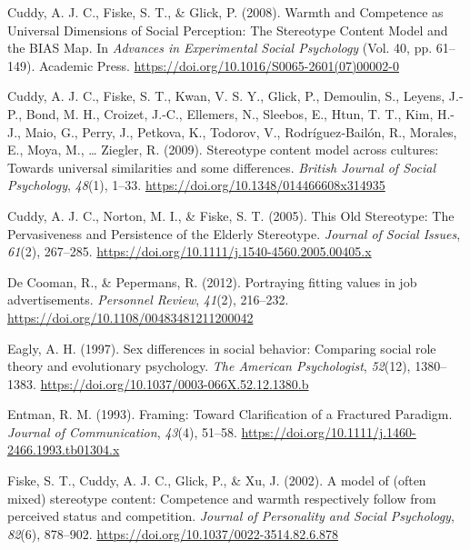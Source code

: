 \documentclass[
  12pt,
  letterpaper,
  DIV=11,
  numbers=noendperiod]{scrartcl}
\newlength{\cslhangindent}
\newlength{\cslentryspacingunit} %
\newenvironment{CSLReferences}[2] %
 {%
  \setlength{\parindent}{0pt}
  \ifodd #1
  \let\oldpar\par
  \def\par{\hangindent=\cslhangindent\oldpar}
  \fi
  \setlength{\parskip}{#2\cslentryspacingunit}
 }%
 {}
\begin{document}
\begin{CSLReferences}{1}{0}
\leavevmode{}%
Cuddy, A. J. C., Fiske, S. T., \& Glick, P. (2008). Warmth and
{Competence} as {Universal Dimensions} of {Social Perception}: {The
Stereotype Content Model} and the {BIAS Map}. In \emph{Advances in
{Experimental Social Psychology}} (Vol. 40, pp. 61--149). {Academic
Press}. \url{https://doi.org/10.1016/S0065-2601(07)00002-0}

\leavevmode{}%
Cuddy, A. J. C., Fiske, S. T., Kwan, V. S. Y., Glick, P., Demoulin, S.,
Leyens, J.-P., Bond, M. H., Croizet, J.-C., Ellemers, N., Sleebos, E.,
Htun, T. T., Kim, H.-J., Maio, G., Perry, J., Petkova, K., Todorov, V.,
Rodríguez‐Bailón, R., Morales, E., Moya, M., \ldots{} Ziegler, R.
(2009). Stereotype content model across cultures: {Towards} universal
similarities and some differences. \emph{British Journal of Social
Psychology}, \emph{48}(1), 1--33.
\url{https://doi.org/10.1348/014466608x314935}

\leavevmode{}%
Cuddy, A. J. C., Norton, M. I., \& Fiske, S. T. (2005). This {Old
Stereotype}: {The Pervasiveness} and {Persistence} of the {Elderly
Stereotype}. \emph{Journal of Social Issues}, \emph{61}(2), 267--285.
\url{https://doi.org/10.1111/j.1540-4560.2005.00405.x}

\leavevmode{}%
De Cooman, R., \& Pepermans, R. (2012). Portraying fitting values in job
advertisements. \emph{Personnel Review}, \emph{41}(2), 216--232.
\url{https://doi.org/10.1108/00483481211200042}

\leavevmode{}%
Eagly, A. H. (1997). Sex differences in social behavior: Comparing
social role theory and evolutionary psychology. \emph{The American
Psychologist}, \emph{52}(12), 1380--1383.
\url{https://doi.org/10.1037/0003-066X.52.12.1380.b}

\leavevmode{}%
Entman, R. M. (1993). Framing: {Toward Clarification} of a {Fractured
Paradigm}. \emph{Journal of Communication}, \emph{43}(4), 51--58.
\url{https://doi.org/10.1111/j.1460-2466.1993.tb01304.x}

\leavevmode{}%
Fiske, S. T., Cuddy, A. J. C., Glick, P., \& Xu, J. (2002). A model of
(often mixed) stereotype content: {Competence} and warmth respectively
follow from perceived status and competition. \emph{Journal of
Personality and Social Psychology}, \emph{82}(6), 878--902.
\url{https://doi.org/10.1037/0022-3514.82.6.878}


\end{CSLReferences}
\end{document}
